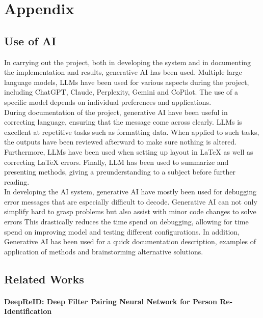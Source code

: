 \chapter{Appendix}\label{cha:appendix}

\section{Use of AI}
In carrying out the project, both in developing the system and in documenting the implementation and results, generative AI has been used. Multiple large language models, LLMs have been used for various aspects during the project, including ChatGPT, Claude, Perplexity, Gemini and CoPilot. The use of a specific model depends on individual preferences and applications.
\\
During documentation of the project, generative AI have been useful in correcting language, ensuring that the message come across clearly. LLMs is excellent at repetitive tasks such as formatting data. When applied to such tasks, the outputs have been reviewed afterward to make sure nothing is altered. Furthermore, LLMs have been used when setting up layout in LaTeX as well as correcting LaTeX errors. Finally, LLM has been used to summarize and presenting methods, giving a preunderstanding to a subject before further reading.
\\
In developing the AI system, generative AI have mostly been used for debugging error messages that are especially difficult to decode. Generative AI can not only simplify hard to grasp problems but also assist with minor code changes to solve errors This drastically reduces the time spend on debugging, allowing for time spend on improving model and testing different configurations. In addition, Generative AI has been used for a quick documentation description, examples of application of methods and brainstorming alternative solutions. 


\section{Related Works}

\subsubsection{DeepReID: Deep Filter Pairing Neural Network for Person Re-Identification}

